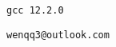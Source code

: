 \documentclass[11pt,twoside]{ctexbook}
\begin{document}
\begin{titlepage}


		
	\begin{center}
		\quad
  
		\vspace{.2\textheight}
	 	\normalsize {\tt gcc 12.2.0}
		
	 	\vspace{2ex}

	  	\vfill

	  	{\tt wenqq3@outlook.com}

	\end{center}
\end{titlepage}
\pagestyle{empty}
\newpage
\setcounter{page}{0}
\thispagestyle{empty}
\tableofcontents
\thispagestyle{empty}
\end{document}
